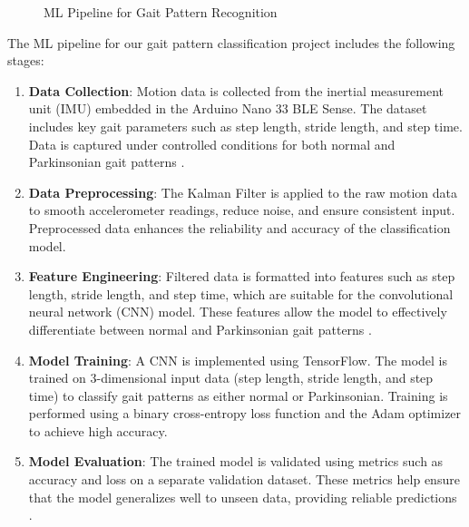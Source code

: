 \begin{figure}[H]
    \caption{ML Pipeline for Gait Pattern Recognition}
    \label{fig:mlpipelinevertical}
\end{figure}


The ML pipeline for our gait pattern classification project includes the following stages:

\begin{enumerate}
    \item \textbf{Data Collection}: Motion data is collected from the inertial measurement unit (IMU) embedded in the Arduino Nano 33 BLE Sense. The dataset includes key gait parameters such as step length, stride length, and step time. Data is captured under controlled conditions for both normal and Parkinsonian gait patterns \cite{ZhangWenwen:2022}.
    
    \item \textbf{Data Preprocessing}: The Kalman Filter is applied to the raw motion data to smooth accelerometer readings, reduce noise, and ensure consistent input. Preprocessed data enhances the reliability and accuracy of the classification model\cite{Kalman:2012}.
    
    \item \textbf{Feature Engineering}: Filtered data is formatted into features such as step length, stride length, and step time, which are suitable for the convolutional neural network (CNN) model. These features allow the model to effectively differentiate between normal and Parkinsonian gait patterns \cite{Panebianco:2018}.
    
    \item \textbf{Model Training}: A CNN is implemented using TensorFlow. The model is trained on 3-dimensional input data (step length, stride length, and step time) to classify gait patterns as either normal or Parkinsonian. Training is performed using a binary cross-entropy loss function and the Adam optimizer to achieve high accuracy\cite{Goodfellow:2016}.
    
    \item \textbf{Model Evaluation}: The trained model is validated using metrics such as accuracy and loss on a separate validation dataset. These metrics help ensure that the model generalizes well to unseen data, providing reliable predictions \cite{Goodfellow:2016}.
    

\end{enumerate}
